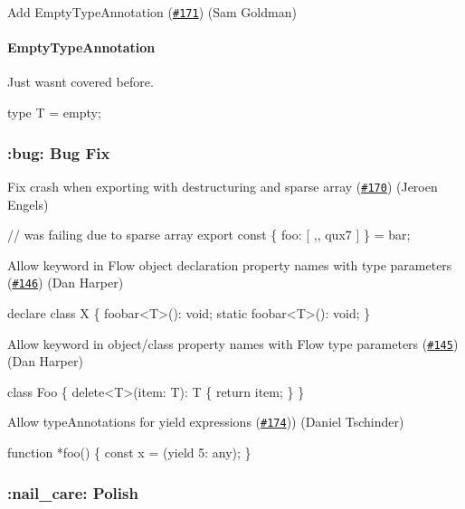 Add Empty\+Type\+Annotation (\href{https://github.com/babel/babylon/pull/171}{\tt \#171}) (Sam Goldman)

\paragraph*{Empty\+Type\+Annotation}

Just wasn\textquotesingle{}t covered before.


\begin{DoxyCode}
type T = empty;
\end{DoxyCode}


\subsubsection*{\+:bug\+: Bug Fix}

Fix crash when exporting with destructuring and sparse array (\href{https://github.com/babel/babylon/pull/170}{\tt \#170}) (Jeroen Engels)


\begin{DoxyCode}
// was failing due to sparse array
export const \{ foo: [ ,, qux7 ] \} = bar;
\end{DoxyCode}


Allow keyword in Flow object declaration property names with type parameters (\href{https://github.com/babel/babylon/pull/146}{\tt \#146}) (Dan Harper)


\begin{DoxyCode}
declare class X \{
  foobar<T>(): void;
  static foobar<T>(): void;
\}
\end{DoxyCode}


Allow keyword in object/class property names with Flow type parameters (\href{https://github.com/babel/babylon/pull/145}{\tt \#145}) (Dan Harper)


\begin{DoxyCode}
class Foo \{
  delete<T>(item: T): T \{
    return item;
  \}
\}
\end{DoxyCode}


Allow type\+Annotations for yield expressions (\href{https://github.com/babel/babylon/pull/174}{\tt \#174})) (Daniel Tschinder)


\begin{DoxyCode}
function *foo() \{
  const x = (yield 5: any);
\}
\end{DoxyCode}


\subsubsection*{\+:nail\+\_\+care\+: Polish}

